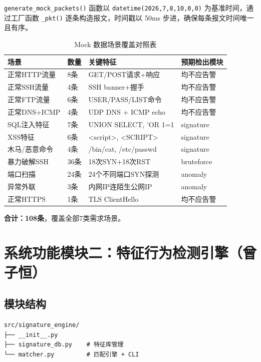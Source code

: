 \documentclass[12pt,a4paper]{ctexart}
\begin{document}
\texttt{generate\_mock\_packets()} 函数以 \texttt{datetime(2026,7,8,10,0,0)} 为基准时间，通过工厂函数 \texttt{\_pkt()} 逐条构造报文，时间戳以 50ms 步进，确保每条报文时间唯一且有序。

\begin{table}[H]
\centering
\caption{Mock 数据场景覆盖对照表}
\label{tab:mock}
\small
\begin{tabular}{@{}lp{2.8cm}p{2.5cm}p{4.5cm}@{}}
\toprule
场景 & 数量 & 关键特征 & 预期检出模块 \\
\midrule
正常HTTP流量 & 8条  & GET/POST请求+响应 & 均不应告警 \\
正常SSH流量 & 4条  & SSH banner+握手 & 均不应告警 \\
正常FTP流量 & 6条  & USER/PASS/LIST命令 & 均不应告警 \\
正常DNS+ICMP & 4条  & UDP DNS + ICMP echo & 均不应告警 \\
SQL注入特征 & 7条  & UNION SELECT, 'OR 1=1 & signature \\
XSS特征     & 6条  & <script>, <SCRIPT> & signature \\
木马/恶意命令 & 4条 & /bin/cat, /etc/passwd & signature \\
暴力破解SSH & 36条 & 18次SYN+18次RST & bruteforce \\
端口扫描    & 24条 & 24个不同端口SYN探测 & anomaly \\
异常外联    & 3条  & 内网IP连陌生公网IP & anomaly \\
正常HTTPS   & 1条  & TLS ClientHello & 均不应告警 \\
\bottomrule
\end{tabular}
\end{table}

\textbf{合计：108条}，覆盖全部7类需求场景。

\section{系统功能模块二：特征行为检测引擎（曾子恒）}

\subsection{模块结构}

\begin{verbatim}
src/signature_engine/
├── __init__.py
├── signature_db.py    # 特征库管理
└── matcher.py         # 匹配引擎 + CLI
\end{verbatim}
\end{document}

